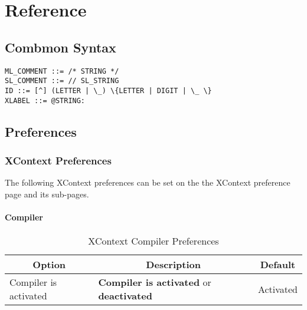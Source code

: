 \section{Reference}
\label{sec:reference}

\subsection{Combmon Syntax}
\label{sec:common-syntax}
\begin{verbatim}
ML_COMMENT ::= /* STRING */
SL_COMMENT ::= // SL_STRING 
ID ::= [^] (LETTER | \_) \{LETTER | DIGIT | \_ \}
XLABEL ::= @STRING:
\end{verbatim}






\subsection{Preferences}
\label{sec:preferences}

\subsubsection{XContext Preferences}
\label{sec:xcontext-preferences}
The following XContext preferences can be set on the  the XContext preference page and its sub-pages.

\paragraph{Compiler}
\begin{EventBNoShortInline}
  \begin{table}[!htbp]
    \centering
    \begin{tabular}{|p{}|p{}|p{}|}
      \hline
      \multicolumn{1}{|c}{\textbf{Option}} & \multicolumn{1}{|c}{\textbf{Description}} &%
                                                                                         \multicolumn{1}{|c|}{\textbf{Default}} \\
      \hline
      Compiler is activated & \textbf{Compiler is activated} or \textbf{deactivated} & Activated \\
      \hline
    \end{tabular}
    \caption{XContext Compiler Preferences}
    \label{tab:xcontext-compiler-preference}
  \end{table}
\end{EventBNoShortInline}

